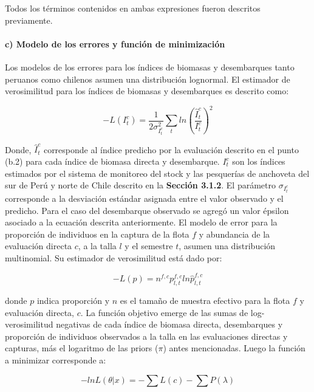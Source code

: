\documentclass[letter,11pt]{article}
\begin{document}
Todos los t\'erminos contenidos en ambas expresiones fueron descritos
previamente.


\paragraph{c) Modelo de los errores y funci\'on de minimizaci\'on}

\quad

Los modelos de los errores para los \'indices de biomasas y desembarques
tanto peruanos como chilenos asumen una distribuci\'on lognormal. El
estimador de verosimilitud para los \'indices de biomasas y desembarques
es descrito como:

\begin{equation}
-L(I^c_t)=\frac{1}{2\sigma^2_{I^c_t}}\sum_{t}ln \left(\frac{\hat{I}^c_t}{I^c_t} \right)^2
\end{equation}

Donde, $\hat{I}_t^c$ corresponde al \'indice predicho por la evaluaci\'on
descrito en el punto (b.2) para cada \'indice de biomasa directa y
desembarque. $I_t^c$ son los \'indices estimados por el sistema de
monitoreo del stock y las pesquer\'ias de anchoveta del sur de Per\'u y
norte de Chile descrito en la \textbf{Secci\'on 3.1.2}. El par\'ametro
$\sigma_{I_t^c}$ corresponde a la desviaci\'on est\'andar asignada entre
el valor observado y el predicho. Para el caso del desembarque observado
se agreg\'o un valor \'epsilon asociado a la ecuaci\'on descrita
anteriormente. El modelo de error para la proporci\'on de individuos en la
captura de la flota $f$ y abundancia de la evaluaci\'on directa $c$, a
la talla $l$ y el semestre $t$, asumen una distribuci\'on multinomial.
Su estimador de verosimilitud est\'a dado por:

\begin{equation}
-L(p)=n^{f,c}p_{l,t}^{f,c}ln\hat{p}_{l,t}^{f,c}
\end{equation}

donde $p$ indica proporci\'on y $n$ es el tama\~{n}o de muestra efectivo
para la flota $f$ y evaluaci\'on directa, $c$. La funci\'on objetivo
emerge de las sumas de log-verosimilitud negativas de cada \'indice de
biomasa directa, desembarques y proporci\'on de individuos observados a la
talla en las evaluaciones directas y capturas, m\'as el logaritmo de las
priors ($\pi$) antes mencionadas. Luego la funci\'on a minimizar
corresponde a:

\begin{equation}
-lnL(\theta|x)=-\sum L(c) - \sum P(\lambda)
\end{equation}
\end{document}
